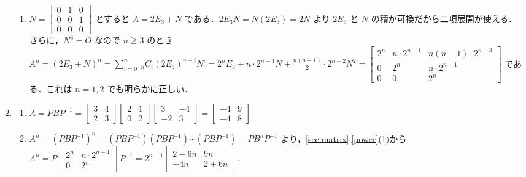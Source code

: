 \documentclass[11pt, uplatex, dvipdfmx]{jsarticle}
\newcommand*{\ds}{\displaystyle}
\begin{document}
\begin{enumerate}
\begin{enumerate}[(1)]
    \item $N=\left[
        \begin{array}{ccc}
          0 & 1 & 0\\
          0 & 0 & 1\\
          0 & 0 & 0
        \end{array}
      \right]$ とすると $A=2E_3+N$ である．$2E_3N =
      N(2E_3)=2N$ より $2E_3$ と $N$ の積が可換だから二項展開が使える．
      さらに，$N^3=O$ なので $n \geqq 3$ のとき
      $A^n = (2E_3+N)^n = {\ds \sum_{i=0}^{n}}~ {}_n C_{i}
      (2E_3)^{n-i} N^i = 2^{n} E_3 + n \cdot 2^{n-1}N +
      \frac{n(n-1)}{2} \cdot 2^{n-2} N^2=\left[
        \begin{array}{ccc}
          2^n & n \cdot 2^{n-1} & n(n-1)\cdot 2^{n-3}\\
          0 & 2^n & n \cdot 2^{n-1}\\
          0 & 0 & 2^n
        \end{array}
      \right]$ である．これは $n=1,2$ でも明らかに正しい．
      
  \end{enumerate}

\item
  \begin{enumerate}[(1)]
    \setlength{\itemsep}{1ex}
    
  \item $A=PBP^{-1} = \left[
      \begin{array}{rr}
        3 & 4\\
        2 & 3
      \end{array}
    \right] \left[
      \begin{array}{rr}
        2 & 1\\
        0 & 2
      \end{array}
    \right] \left[
      \begin{array}{rr}
        3 & -4\\
        -2 & 3
      \end{array}
    \right] = \left[
      \begin{array}{rr}
        -4 & 9\\
        -4 & 8
      \end{array}
    \right]$
    
  \item
    $A^n = (PBP^{-1})^n = (PBP^{-1})(PBP^{-1}) \cdots (PBP^{-1}) =
    PB^n P^{-1}$ より，\ref{sec:matrix}.\ref{power}(1)から $A^n = P \left[
        \begin{array}{cc}
          2^n & n\cdot 2^{n-1}\\
          0 & 2^n
        \end{array}
      \right]P^{-1} = 2^{n-1} \left[
        \begin{array}{cc}
          2-6n & 9n\\
          -4n & 2+6n
        \end{array}
      \right]$.
  \end{enumerate}


\end{enumerate}
\end{document}
